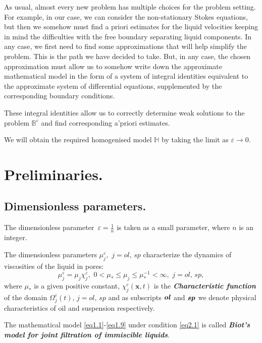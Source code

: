 \documentclass{article}
\theoremstyle{plain}
\theoremstyle{definition}
\numberwithin{equation}{section}
\begin{document}
As usual, almost every new problem has multiple choices for the problem setting. For example, in our case, we can consider the non-stationary Stokes equations, but then we somehow must find a priori estimates for the liquid velocities keeping in mind the difficulties with the free boundary separating liquid components.
In any case, we first need to find some approximations that will help simplify the problem. This is the path we have decided to take. But, in any case, the chosen approximation must allow us to somehow write down the approximate mathematical model in the form of a system of integral identities equivalent to the approximate system of differential equations, supplemented by the corresponding boundary conditions. 

These integral identities allow us to correctly determine weak solutions to the problem $\mathbb{B}^{\varepsilon}$ and find corresponding a'priori estimates.

We will obtain the required homogenised model $\mathbb{H}$ by taking the limit as $\varepsilon\rightarrow{0}$.

\section{Preliminaries.}
\label{sec2}

\subsection{Dimensionless parameters.}

The dimensionless parameter $\displaystyle\,\varepsilon=\frac{1}{n}$ is taken as a small parameter,
where $n$ is an integer.

The dimensionless parameters $\mu^{\varepsilon}_{j},\,\,j=ol,\,sp$ characterize the dynamics of
viscosities of the liquid in pores:
\begin{equation}\label{eq2.1}
\mu^{\varepsilon}_{j}=\mu_{j}\chi^{\varepsilon}_{j},\,\, 0<\mu_{*}\leqslant\mu_{j}\leqslant\mu_{*}^{-1}<\infty,\,\,j=ol,\,sp,
\end{equation}
where $\mu_{*}$ is a given positive constant, $\chi^{\varepsilon}_{j}(\boldsymbol{x},t)$ is the \textbf{\emph{Characteristic function}} of the domain $\Omega^{\varepsilon}_{j}(t),\,j=ol,\,sp$ and as subscripts $\textbf{\emph{ol}}$ and $\textbf{\emph{sp}}$ we denote physical characteristics of oil and suspension respectively.

The mathematical model \eqref{eq1.1}-\eqref{eq1.9} under condition \eqref{eq2.1} is called \textbf{\emph{Biot's model for joint filtration of immiscible liquids}}.
\end{document}
